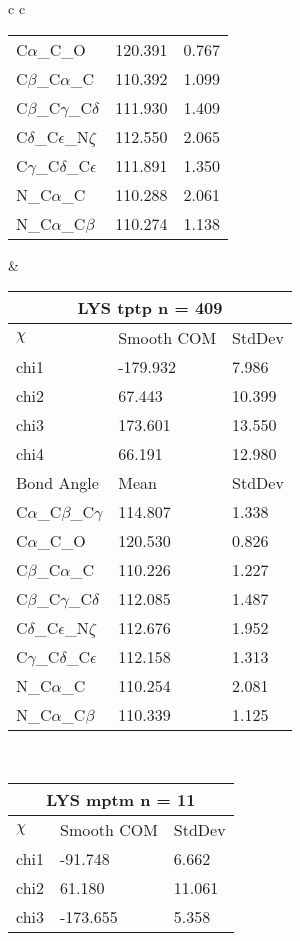 \begin{longtable}{ c c }
\begin{tabular}{ l l l }
  C$\alpha$\_C\_O & 120.391 & 0.767\\
  C$\beta$\_C$\alpha$\_C & 110.392 & 1.099\\
  C$\beta$\_C$\gamma$\_C$\delta$ & 111.930 & 1.409\\
  C$\delta$\_C$\epsilon$\_N$\zeta$ & 112.550 & 2.065\\
  C$\gamma$\_C$\delta$\_C$\epsilon$ & 111.891 & 1.350\\
  N\_C$\alpha$\_C & 110.288 & 2.061\\
  N\_C$\alpha$\_C$\beta$ & 110.274 & 1.138\\
  \bottomrule
  \end{tabular}
  &
  \begin{tabular}{ l l l }
  \toprule
  \multicolumn{3}{c}{LYS \textbf{tptp} n = 409} \\ \toprule
  $\chi$       & Smooth COM & StdDev \\ \midrule
  chi1 & -179.932 & 7.986 \\ 
  chi2 & 67.443 & 10.399 \\ 
  chi3 & 173.601 & 13.550 \\ 
  chi4 & 66.191 & 12.980 \\ \midrule
  Bond Angle   & Mean     & StdDev \\ \midrule
  C$\alpha$\_C$\beta$\_C$\gamma$ & 114.807 & 1.338\\
  C$\alpha$\_C\_O & 120.530 & 0.826\\
  C$\beta$\_C$\alpha$\_C & 110.226 & 1.227\\
  C$\beta$\_C$\gamma$\_C$\delta$ & 112.085 & 1.487\\
  C$\delta$\_C$\epsilon$\_N$\zeta$ & 112.676 & 1.952\\
  C$\gamma$\_C$\delta$\_C$\epsilon$ & 112.158 & 1.313\\
  N\_C$\alpha$\_C & 110.254 & 2.081\\
  N\_C$\alpha$\_C$\beta$ & 110.339 & 1.125\\
  \bottomrule
  \end{tabular}
  \\
  \begin{tabular}{ l l l }
  \toprule
  \multicolumn{3}{c}{LYS \textbf{mptm} n = 11} \\ \toprule
  $\chi$       & Smooth COM & StdDev \\ \midrule
  chi1 & -91.748 & 6.662 \\ 
  chi2 & 61.180 & 11.061 \\ 
  chi3 & -173.655 & 5.358 \\ 

\end{tabular}
\end{longtable}
